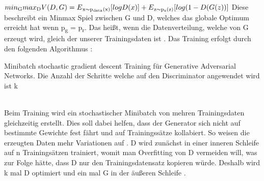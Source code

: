 \documentclass{llncs}
\begin{document}
\begin{math}
min\textsubscript{G} max\textsubscript{D}V(D,G)=E\textsubscript{x$\sim$p\textsubscript{data}(x)}[logD(x)]  + E\textsubscript{z$\sim$p\textsubscript{z}(z)}[log(1-D(G(z))]
\\\\             
\end{math}
Diese beschreibt ein Minmax Spiel zwischen G und D, welches das globale Optimum erreicht hat wenn p\textsubscript{g} = p\textsubscript{r}. Das heißt, wenn die Datenverteilung, welche von G erzeugt wird, gleich der unserer Trainingsdaten ist \cite{goodfellow2014}. Das Training erfolgt durch den folgenden Algorithmus  \cite{goodfellow2014}:
\\
\begin{algorithm}[H]
		\caption{Minibatch stochastic gradient descent Training für Generative Adversarial Networks. Die Anzahl der Schritte welche auf den Discriminator angewendet wird ist k }	
\end{algorithm}
~\\
Beim Training wird ein stochastischer Minibatch von mehren Trainingsdaten gleichzeitig erstellt. Dies soll dabei helfen, dass der Generator sich nicht auf bestimmte Gewichte fest fährt und auf Trainingssätze kollabiert. So weisen die erzeugten Daten mehr Variationen auf \cite{improvingan}. D wird zunächst in einer inneren Schleife auf n Trainingsätzen trainiert, womit man Overfitting von D vermeiden will, was zur Folge hätte, dass D nur den Trainingsdatensatz kopieren würde. Deshalb wird k mal D optimiert und ein mal G in der äußeren Schleife  \cite{goodfellow2014}. 
\end{document}
